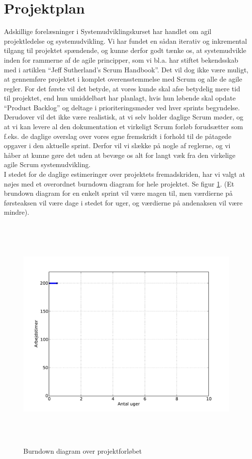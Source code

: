 \documentclass[12pt]{article}   %
\begin{document}
\section{Projektplan}
Adskillige forelæsninger i Systemudviklingskurset har handlet om agil
projektledelse og systemudvikling. Vi har fundet en sådan iterativ og
inkremental tilgang til projektet spændende, og kunne derfor godt tænke os, at
systemudvikle inden for rammerne af de agile principper, som vi bl.a. har
stiftet bekendsskab med i artiklen ``Jeff Sutherland's Scrum
Handbook''\cite{scrum}. Det vil dog ikke være muligt, at gennemføre projektet
i komplet overensstemmelse med Scrum og alle de agile regler. For det første
vil det betyde, at vores kunde skal afse betydelig mere tid til projektet,
end hun umiddelbart har planlagt, hvis hun løbende skal opdate ``Product
Backlog'' og deltage i prioriteringsmøder ved hver sprints begyndelse.
Derudover vil det ikke være realistisk, at vi selv holder daglige Scrum møder,
og at vi kan levere al den dokumentation et virkeligt Scrum forløb
forudsætter som f.eks. de daglige overslag over vores egne fremskridt i forhold
til de påtagede opgaver i den aktuelle sprint. Derfor vil vi slække på nogle af 
reglerne, og vi håber at kunne gøre det uden at bevæge os alt for langt væk fra 
den virkelige agile Scrum systemudvikling.\\
I stedet for de daglige estimeringer over projektets fremadskriden, har vi
valgt at nøjes med et overordnet burndown diagram for hele projektet. Se figur
\ref{fig:bd}. (Et brundown diagram for en enkelt sprint vil være magen til,
men værdierne på førsteaksen vil være dage i stedet for uger, og værdierne på
andenaksen vil være mindre). 

\begin{figure}[!ht]
	\centering
\includegraphics[width=15cm, height=12cm]{burndown.pdf}
\caption{Burndown diagram over projektforløbet}
\label{fig:bd}
\end{figure}
\end{document}
